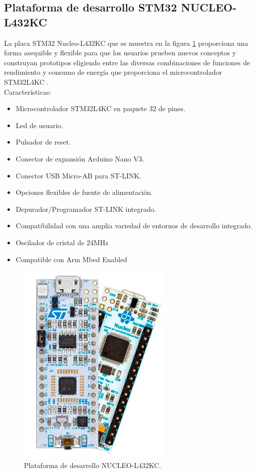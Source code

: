 \subsection{Plataforma de desarrollo STM32 NUCLEO-L432KC}
La placa STM32 Nucleo-L432KC que se muestra en la figura \ref{fig:nucleol432kc} proporciona una forma asequible y flexible para que los usuarios prueben nuevos conceptos y construyan prototipos eligiendo entre las diversas combinaciones de funciones de rendimiento y consumo de energía que proporciona el microcontrolador STM32L4KC \citep{NUCLEOL432KC}.
\\Características:
\begin{itemize}
	\item Microcontrolador STM32L4KC en paquete 32 de pines.
	\item Led de usuario.
	\item Pulsador de reset.
	\item Conector de expansión Arduino Nano V3.
	\item Conector USB Micro-AB para ST-LINK.
	\item Opciones flexibles de fuente de alimentación.
	\item Depurador/Programador ST-LINK integrado.
	\item Compatibilidad con una amplia variedad de entornos de desarrollo integrado.
	\item Oscilador de cristal de 24MHz
	\item Compatible con Arm Mbed Enabled  
\end{itemize}
\begin{figure}[htbp]
	\centering
	\includegraphics[width=.3\textwidth]{./Figures/nucleo-l432kc.jpg}
	\caption{Plataforma de desarrollo NUCLEO-L432KC.}
	\label{fig:nucleol432kc}
\end{figure}
\vspace{5cm}

